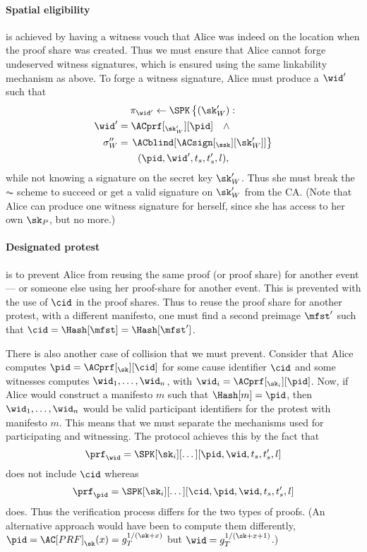 \paragraph{Spatial eligibility}%
\label{analysis-spatial}

 is achieved by having a witness vouch that Alice was 
indeed on the location when the proof share was created.
Thus we must ensure that Alice cannot forge undeserved witness signatures, which 
is ensured using the same linkability mechanism as above.
To forge a witness signature, Alice must produce a \(\wid'\) such that
\begin{multline*}
  \pi_{\wid'}\gets \SPK\left\{ (\sk_W') : \right. \\
    \begin{aligned}
      \wid' &= \ACprf[_{\sk_W'}][\pid] \quad \land \\
      \sigma_W'' &= \left. \ACblind[\ACsign[_{\ssk}][\sk_W']] \right\}
    \end{aligned} \\
      (\pid, \wid', t_s, t_s', l),
\end{multline*}
while not knowing a signature on the secret key \(\sk_W'\).
Thus she must break the \(\AC\) scheme to succeed or get a valid signature on 
\(\sk_W'\) from the \ac{CA}.
(Note that Alice can produce one witness signature for herself, since she has 
access to her own \(\sk_P\), but no more.)

\paragraph{Designated protest}%
\label{analysis-designated}

 is to prevent Alice from reusing the same proof (or proof 
share) for another event --- or someone else using her proof-share for another 
event.
This is prevented with the use of \(\cid\) in the proof shares.
Thus to reuse the proof share for another protest, with a different manifesto, 
one must find a second preimage \(\mfst'\) such that \(\cid = \Hash[\mfst] = 
  \Hash[\mfst']\).

There is also another case of collision that we must prevent.
Consider that Alice computes \(\pid = \ACprf[_\sk][\cid]\) for some cause 
identifier \(\cid\) and some witnesses computes \(\wid_1, \dotsc, \wid_n\), 
with \(\wid_i = \ACprf[_{\sk_i}][\pid]\).
Now, if Alice would construct a manifesto \(m\) such that \(\Hash[m] = \pid\), 
then \(\wid_1, \dotsc, \wid_n\) would be valid participant identifiers for the 
protest with manifesto \(m\).
This means that we must separate the mechanisms used for participating and 
witnessing.
The protocol achieves this by the fact that \[
  \prf_{\wid} = \SPK[\sk_i][\dotsc][\pid, \wid, t_s, t_s', l]
\]
does not include \(\cid\) whereas \[
  \prf_{\pid} = \SPK[\sk_i][\dotsc][\cid, \pid, \wid, t_s, t_s', l]
\]
does.
Thus the verification process differs for the two types of proofs.
(An alternative approach would have been to compute them differently, \eg 
\(\pid = \AC[PRF]_{\sk}(x) = g_T^{1/(\sk+x)}\) but \(\wid = 
  g_T^{1/(\sk+x+1)}\).)


